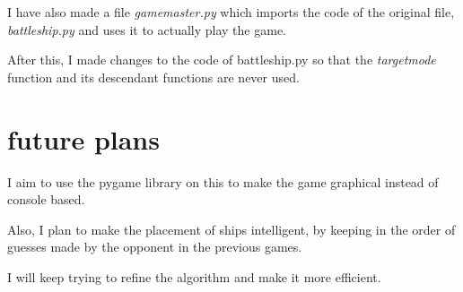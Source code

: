 \documentclass{article}
\begin{document}
	I have also made a file \textit{gamemaster.py} which imports the code of the original file, \textit{battleship.py} and uses it to actually play the game.
	
	After this, I made changes to the code of battleship.py so that the \textit{targetmode} function and its descendant functions are never used.
   
   \section{future plans}
   I aim to use the pygame library on this to make the game graphical instead of console based.
  
  Also, I plan to make the placement of ships intelligent, by keeping in the order of guesses made by the opponent in the previous games.
  
  I will keep trying to refine the algorithm and make it more efficient.
\end{document}
